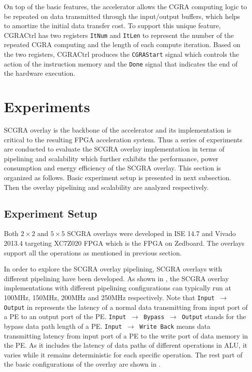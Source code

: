 On top of the basic features, the accelerator allows the CGRA computing logic to be repeated on data transmitted through the input/output buffers, which helps to amortize the initial data transfer cost. To support this unique feature, CGRACtrl has two registers \texttt{ItNum} and \texttt{ItLen} to represent the number of the repeated CGRA computing and the length of each compute iteration. Based on the two registers, CGRACtrl produces the \texttt{CGRAStart} signal which controls the action of the instruction memory and the \texttt{Done} signal that indicates the end of the hardware execution. 

\section{Experiments}
SCGRA overlay is the backbone of the accelerator and its implementation is critical to the resulting FPGA acceleration system. Thus a series of experiments are conducted to evaluate the SCGRA overlay implementation in terms of pipelining and scalability which further exhibits the performance, power consumption and energy efficiency of the SCGRA overlay. This section is organized as follows. Basic experiment setup is presented in next subsection. Then the overlay pipelining and scalability are analyzed respectively. 

\subsection{Experiment Setup}
Both $2 \times 2$ and $5 \times 5$ SCGRA overlays were developed in ISE 14.7 and Vivado 2013.4 targeting XC7Z020 FPGA which is the FPGA on Zedboard. The overlays support all the operations as mentioned in previous section. 

In order to explore the SCGRA overlay pipelining, SCGRA overlays with different pipelining have been developed. As shown in , the SCGRA overlay implementations with different pipelining configurations can typically run at 100MHz, 150MHz, 200MHz and 250MHz respectively. Note that \texttt{Input $\rightarrow$ Output} in  represents the latency of a normal data transmitting from input port of a PE to an output port of the PE. \texttt{Input $\rightarrow$ Bypass $\rightarrow$ Output} stands for the bypass data path length of a PE. \texttt{Input $\rightarrow$ Write Back} means data transmitting latency from input port of a PE to the write port of data memory in the PE. As it includes the latency of data paths of different operations in ALU, it varies while it remains deterministic for each specific operation. The rest part of the basic configurations of the overlay are shown in . 

